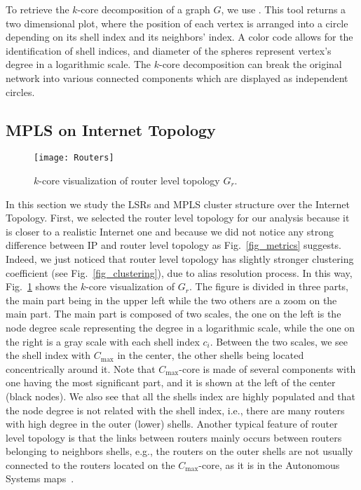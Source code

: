 To retrieve the $k$-core decomposition of a graph $G$, we use
\lanet\cite{Alvarez06k}. This tool returns a two dimensional plot, where the
position of each vertex is arranged into a circle depending on its shell index
and its neighbors' index. A color code allows for the identification of shell
indices, and diameter of the spheres represent vertex's degree in a logarithmic
scale. The $k$-core decomposition can break the original network into various
connected components which are displayed as independent circles.

\subsection{MPLS on Internet Topology}\label{cluster.topo}
\begin{figure}[!t]
  \begin{center}
    \texttt{[image: Routers]}
  \end{center}
  \caption{$k$-core visualization of router level topology $G_{r}$.}
  \label{fig_k_core_routers}
\end{figure}

In this section we study the LSRs and MPLS cluster structure over the Internet
Topology.  First, we selected the router level topology for our analysis because
it is closer to a realistic Internet one and because  we did not notice any
strong difference between IP and router level topology as Fig.~\ref{fig_metrics}
suggests. Indeed, we just noticed that router level topology has slightly
stronger clustering coefficient (see Fig.~\ref{fig_clustering}), due to alias
resolution process. In this way, Fig.~\ref{fig_k_core_routers} shows the
$k$-core visualization of $G_{r}$.  The figure is divided in three parts, the
main part being in the upper left while the two others are a zoom on the main
part.  The main part is composed of two scales, the one on the left is the node
degree scale representing the degree in a logarithmic scale, while the one on
the right is a gray scale with each shell index $c_i$. Between the two scales,
we see the shell index with $C_{\max}$ in the center, the other shells being
located concentrically around it. Note that $C_{\max}$-core is made of several components with one
having the most significant part, and it is shown at the left of the center
(black nodes).  We also see that all the shells index are highly populated and
that the node degree is not related with the shell index, i.e., there are many
routers with high degree in the outer (lower) shells.  Another typical feature
of router level topology is that the links between routers mainly occurs between
routers belonging to neighbors shells, e.g., the routers on the outer shells are
not usually connected to the routers located on the  $C_{\max}$-core, as it is
in the Autonomous Systems maps~\cite{Alvarez06k}.

